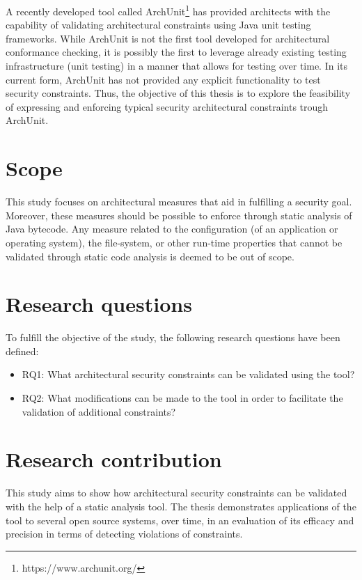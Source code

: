 A recently developed tool called ArchUnit\footnote{https://www.archunit.org/} has provided architects with the capability of validating architectural constraints using Java unit testing frameworks. While ArchUnit is not the first tool developed for architectural conformance checking, it is possibly the first to leverage already existing testing infrastructure (unit testing) in a manner that allows for testing over time. In its current form, ArchUnit has not provided any explicit functionality to test security constraints. Thus, the objective of this thesis is to explore the feasibility of expressing and enforcing typical security architectural constraints trough ArchUnit.

\section{Scope}

This study focuses on architectural measures that aid in fulfilling a security goal. Moreover, these measures should be possible to enforce through static analysis of Java bytecode. Any measure related to the configuration (of an application or operating system), the file-system, or other run-time properties that cannot be validated through static code analysis is deemed to be out of scope.

\section{Research questions}
To fulfill the objective of the study, the following research questions have been defined:

\begin{itemize}
    \item RQ1: What architectural security constraints can be validated using the tool?
    \item RQ2: What modifications can be made to the tool in order to facilitate the validation of additional constraints?
\end{itemize}

\section{Research contribution}

This study aims to show how architectural security constraints can be validated with the help of a static analysis tool. The thesis demonstrates applications of the tool to several open source systems, over time, in an evaluation of its efficacy and precision in terms of detecting violations of constraints.

